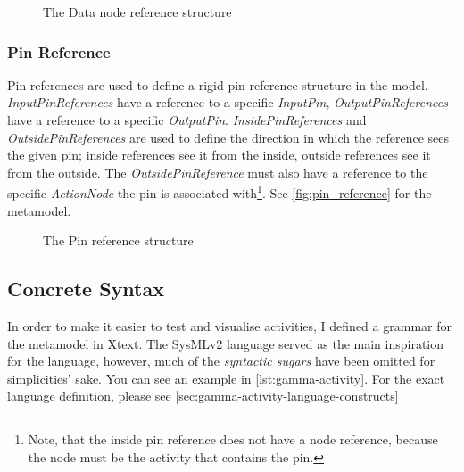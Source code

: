 \begin{figure}[!ht]
	\centering
	
	\caption{The Data node reference structure}
	\label{fig:data_source_target_reference_example}
\end{figure}

\subsubsection*{Pin Reference}\label{ssec:pin-reference}

Pin references are used to define a rigid pin-reference structure in the model. \emph{InputPinReferences} have a reference to a specific \emph{InputPin}, \emph{OutputPinReferences} have a reference to a specific \emph{OutputPin}. \emph{InsidePinReferences} and \emph{OutsidePinReferences} are used to define the direction in which the reference sees the given pin; inside references see it from the inside, outside references see it from the outside. The \emph{OutsidePinReference} must also have a reference to the specific \emph{ActionNode} the pin is associated with\footnote{Note, that the inside pin reference does not have a node reference, because the node must be the activity that contains the pin.}. See \autoref{fig:pin_reference} for the metamodel.

\begin{figure}[!ht]
	\centering
	
	\caption{The Pin reference structure}
	\label{fig:pin_reference}
\end{figure}

\subsection{Concrete Syntax}

In order to make it easier to test and visualise activities, I defined a grammar for the metamodel in Xtext. The SysMLv2 language served as the main inspiration for the language, however, much of the \emph{syntactic sugars} have been omitted for simplicities' sake. You can see an example in \autoref{lst:gamma-activity}. For the exact language definition, please see \autoref{sec:gamma-activity-language-constructs}

